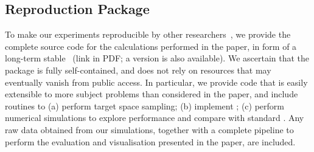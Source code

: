 \begin{appendix}
\section{Reproduction Package}\label{sec:repro} 
    
To make our experiments reproducible by other researchers~\cite{reprobook:2019}, we provide the complete source 
code for the calculations performed in the paper, in form of a long-term 
stable~\cite{Mauerer:2022} \repro (link in PDF; a
\doirepro version \cite{reprPackage} 
is also available). We ascertain that the package is fully
self-contained, and does not rely on resources that may eventually 
vanish from public access. In particular, we provide code that is
easily extensible to more subject problems than considered
in the paper, and include routines to (a) perform target space 
sampling; (b) implement \ourQAOA; (c) perform numerical simulations 
to explore performance and compare with standard \QAOA.
Any raw data obtained from our simulations, together
with a complete pipeline to perform the evaluation and visualisation
presented in the paper, are included.
\end{appendix}
